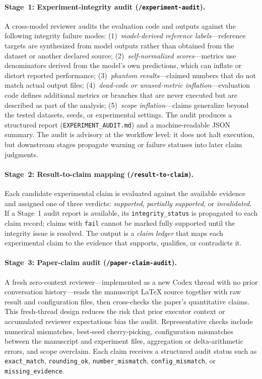 \paragraph{Stage~1: Experiment-integrity audit (\texttt{/experiment-audit}).}
A cross-model reviewer audits the evaluation code and outputs against the following integrity failure modes:
(1)~\emph{model-derived reference labels}---reference targets are synthesized from model outputs rather than obtained from the dataset or another declared source;
(2)~\emph{self-normalized scores}---metrics use denominators derived from the model's own predictions, which can inflate or distort reported performance;
(3)~\emph{phantom results}---claimed numbers that do not match actual output files;
(4)~\emph{dead-code or unused-metric inflation}---evaluation code defines additional metrics or branches that are never executed but are described as part of the analysis;
(5)~\emph{scope inflation}---claims generalize beyond the tested datasets, seeds, or experimental settings.
The audit produces a structured report (\texttt{EXPERIMENT\_AUDIT.md}) and a machine-readable JSON summary.
The audit is advisory at the workflow level: it does not halt execution, but downstream stages propagate warning or failure statuses into later claim judgments.

\paragraph{Stage~2: Result-to-claim mapping (\texttt{/result-to-claim}).}
Each candidate experimental claim is evaluated against the available evidence and assigned one of three verdicts: \emph{supported}, \emph{partially supported}, or \emph{invalidated}.
If a Stage~1 audit report is available, its \texttt{integrity\_status} is propagated to each claim record; claims with \texttt{fail} cannot be marked fully supported until the integrity issue is resolved.
The output is a \emph{claim ledger} that maps each experimental claim to the evidence that supports, qualifies, or contradicts it.

\paragraph{Stage~3: Paper-claim audit (\texttt{/paper-claim-audit}).}
A fresh zero-context reviewer---implemented as a new Codex thread with no prior conversation history---reads the manuscript \LaTeX{} source together with raw result and configuration files, then cross-checks the paper's quantitative claims.
This fresh-thread design reduces the risk that prior executor context or accumulated reviewer expectations bias the audit.
Representative checks include numerical mismatches, best-seed cherry-picking, configuration mismatches between the manuscript and experiment files, aggregation or delta-arithmetic errors, and scope overclaim.
Each claim receives a structured audit status such as \texttt{exact\_match}, \texttt{rounding\_ok}, \texttt{number\_mismatch}, \texttt{config\_mismatch}, or \texttt{missing\_evidence}.

